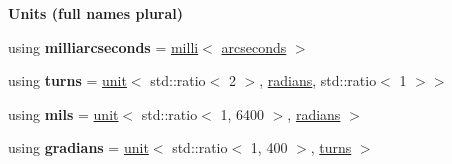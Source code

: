 \begin{Indent}{\bf Units (full names plural)}
\begin{DoxyCompactItemize}
\item 
\hypertarget{namespaceunits_1_1angle_a49cbb5b61d2c119ad85ce0cd6471e055}{}using {\bfseries milliarcseconds} = \hyperlink{group___unit_manipulators_gaec9d1c320e180eb59f3cb3094d8079dd}{milli}$<$ \hyperlink{structunits_1_1unit}{arcseconds} $>$\label{namespaceunits_1_1angle_a49cbb5b61d2c119ad85ce0cd6471e055}

\item 
\hypertarget{namespaceunits_1_1angle_af7a45d03f25546f4c951e78f7714792a}{}using {\bfseries turns} = \hyperlink{structunits_1_1unit}{unit}$<$ std\+::ratio$<$ 2 $>$, \hyperlink{structunits_1_1unit}{radians}, std\+::ratio$<$ 1 $>$$>$\label{namespaceunits_1_1angle_af7a45d03f25546f4c951e78f7714792a}

\item 
\hypertarget{namespaceunits_1_1angle_aa57a8e9913de935e37a88142456872af}{}using {\bfseries mils} = \hyperlink{structunits_1_1unit}{unit}$<$ std\+::ratio$<$ 1, 6400 $>$, \hyperlink{structunits_1_1unit}{radians} $>$\label{namespaceunits_1_1angle_aa57a8e9913de935e37a88142456872af}

\item 
\hypertarget{namespaceunits_1_1angle_adb0393d879713169c64796a4c1fa41ea}{}using {\bfseries gradians} = \hyperlink{structunits_1_1unit}{unit}$<$ std\+::ratio$<$ 1, 400 $>$, \hyperlink{structunits_1_1unit}{turns} $>$\label{namespaceunits_1_1angle_adb0393d879713169c64796a4c1fa41ea}

\end{DoxyCompactItemize}
\end{Indent}
